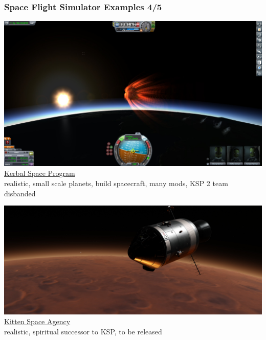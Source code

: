 \documentclass[aspectratio=169,11pt,xcolor=dvipsnames]{beamer}
\begin{document}
\begin{frame}
  \frametitle{Space Flight Simulator Examples 4/5}
  \begin{minipage}[t]{0.49\textwidth}
    \begin{center}
      \includegraphics[width=\textwidth]{ksp}\\
      \href{https://www.kerbalspaceprogram.com/}{Kerbal Space Program}\\
      realistic, small scale planets, build spacecraft, many mods, KSP 2 team disbanded
    \end{center}
  \end{minipage}
  \begin{minipage}[t]{0.49\textwidth}
    \begin{center}
      \includegraphics[width=\textwidth]{ksa}\\
      \href{https://rocketwerkz.com/}{Kitten Space Agency}\\
      realistic, spiritual successor to KSP, to be released
    \end{center}
  \end{minipage}
\end{frame}
\end{document}
